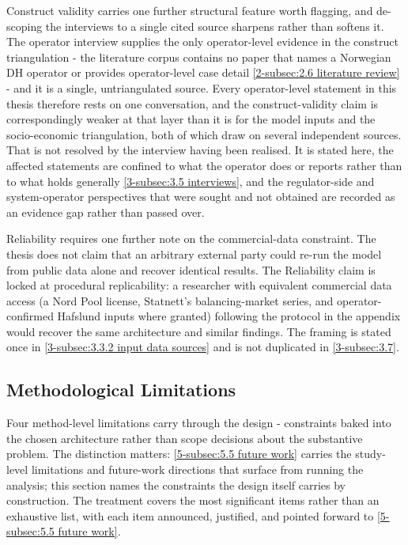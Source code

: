 Construct validity carries one further structural feature worth flagging, and de-scoping the interviews to a single cited source sharpens rather than softens it. The operator interview supplies the only operator-level evidence in the construct triangulation - the literature corpus contains no paper that names a Norwegian DH operator or provides operator-level case detail \autoref{2-subsec:2.6 literature review} - and it is a single, untriangulated source. Every operator-level statement in this thesis therefore rests on one conversation, and the construct-validity claim is correspondingly weaker at that layer than it is for the model inputs and the socio-economic triangulation, both of which draw on several independent sources. That is not resolved by the interview having been realised. It is stated here, the affected statements are confined to what the operator does or reports rather than to what holds generally \autoref{3-subsec:3.5 interviews}, and the regulator-side and system-operator perspectives that were sought and not obtained are recorded as an evidence gap rather than passed over. 

Reliability requires one further note on the commercial-data constraint. The thesis does not claim that an arbitrary external party could re-run the model from public data alone and recover identical results. The Reliability claim is locked at procedural replicability: a researcher with equivalent commercial data access (a Nord Pool license, Statnett's balancing-market series, and operator-confirmed Hafslund inputs where granted) following the protocol in the appendix would recover the same architecture and similar findings. The framing is stated once in \autoref{3-subsec:3.3.2 input data sources} and is not duplicated in \autoref{3-subsec:3.7}.



\subsection{Methodological Limitations}
\label{3-subsec:3.7}

Four method-level limitations carry through the design - constraints baked into the chosen architecture rather than scope decisions about the substantive problem. The distinction matters: \autoref{5-subsec:5.5 future work} carries the study-level limitations and future-work directions that surface from running the analysis; this section names the constraints the design itself carries by construction. The treatment covers the most significant items rather than an exhaustive list, with each item announced, justified, and pointed forward to \autoref{5-subsec:5.5 future work}.

